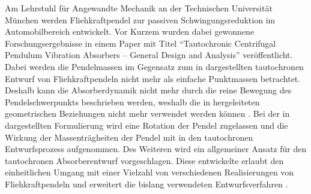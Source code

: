 Am Lehrstuhl für Angewandte Mechanik an der Technischen Universität München werden
Fliehkraftpendel zur passiven Schwingungsreduktion im Automobilbereich entwickelt.
Vor Kurzem wurden dabei gewonnene Forschungsergebnisse in einem Paper mit Titel
"`Tautochronic Centrifugal Pendulum Vibration Absorbers -- General Design and Analysis"' 
\cite{Mayet:Tautochronic} veröffentlicht. 
Dabei werden die Pendelmassen im Gegensatz zum in \cite{Denman:Tautochronic}
dargestellten tautochronen Entwurf von Fliehkraftpendeln nicht mehr als einfache 
Punktmassen betrachtet. 
Deshalb kann die Absorberdynamik nicht mehr durch die reine Bewegung des Pendelschwerpunkts
beschrieben werden, weshalb die in \cite{Denman:Tautochronic} hergeleiteten geometrischen
Beziehungen nicht mehr verwendet werden können \cite{Mayet:Tautochronic}.
Bei der in \cite{Mayet:Tautochronic} dargestellten Formulierung wird eine Rotation der
Pendel zugelassen und die Wirkung
der Massenträgheiten der Pendel mit in den tautochronen Entwurfsprozess aufgenommen.
Des Weiteren wird ein allgemeiner Ansatz für den tautochronen Absorberentwurf 
vorgeschlagen. 
Diese entwickelte  erlaubt den einheitlichen Umgang mit einer Vielzahl
von verschiedenen Realisierungen von Fliehkraftpendeln und erweitert 
die bislang verwendeten Entwurfsverfahren \cite{Mayet:Tautochronic}.
































